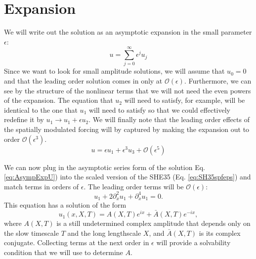 \documentclass[api,pof,pre,12pt,a4paper]{revtex4-1}
\begin{document}
\section{Expansion}
We will write out the solution as an asymptotic expansion in the small parameter $\epsilon$:
\begin{equation}
u=\sum_{j=0}^{\infty} \epsilon^j u_j
\end{equation}
Since we want to look for small amplitude solutions, we will assume that $u_0=0$ and that the leading order solution comes in only at $\mathcal{O}(\epsilon)$. Furthermore, we can see by the structure of the nonlinear terms that we will not need the even powers of the expansion.  The equation that $u_2$ will need to satisfy, for example, will be identical to the one that $u_1$ will need to satisfy so that we could effectively redefine it by $u_1\rightarrow u_1+\epsilon u_2$.  We will finally note that the leading order effects of the spatially modulated forcing will by captured by making the expansion out to order $\mathcal{O}(\epsilon^3)$.   
\begin{equation}
u=\epsilon u_1 + \epsilon^3 u_3  + \mathcal{O}(\epsilon^5)
\label{eq:AsympExpU}
\end{equation}

We can now plug in the asymptotic series form of the solution Eq. \ref{eq:AsympExpU}) into the scaled version of the SHE35 (Eq. \ref{eq:SH35spfeps}) and match terms in orders of $\epsilon$.  The leading order terms will be $\mathcal{O}(\epsilon)$:
\begin{equation}
u_1+2\partial_x^2 u_1 +\partial_x^4 u_1 = 0.
\end{equation}
This equation has a solution of the form
\begin{equation}
u_1(x,X,T)=A(X,T) e^{i x}+ \bar{A}(X,T) e^{-ix},
\label{eq:u1sol}
\end{equation}
where $A(X,T)$ is a still undetermined complex amplitude that depends only on the slow timescale $T$ and the long lengthscale $X$, and $\bar{A}(X,T)$ is its complex conjugate. Collecting terms at the next order in $\epsilon$ will provide a solvability condition that we will use to determine $A$.
\end{document}

